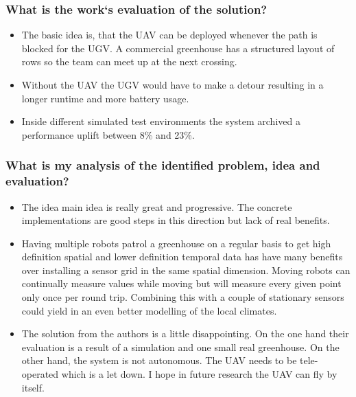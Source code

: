 \subsubsection*{What is the work`s evaluation of the solution?}
\begin{itemize}
    \item The basic idea is, that the UAV can be deployed whenever the path is blocked for the UGV. A commercial greenhouse has a structured layout of rows so the team can meet up at the next crossing.
    \item Without the UAV the UGV would have to make a detour resulting in a longer runtime and more battery usage.
    \item Inside different simulated test environments the system archived a performance uplift between 8\% and 23\%.
\end{itemize}
\subsubsection*{What is my analysis of the identified problem, idea and evaluation?}
\begin{itemize}
    \item The idea main idea is really great and progressive. The concrete implementations are good steps in this direction but lack of real benefits.
    \item Having multiple robots patrol a greenhouse on a regular basis to get high definition spatial and lower definition temporal data has have many benefits over installing 
    a sensor grid in the same spatial dimension. Moving robots can continually measure values while moving but will measure every given point only once per round trip. Combining this
    with a couple of stationary sensors could yield in an even better modelling of the local climates.
    \item The solution from the authors is a little disappointing. On the one hand their evaluation is a result of a simulation and one small real greenhouse. On the other hand,
    the system is not autonomous. The UAV needs to be tele-operated which is a let down. I hope in future research the UAV can fly by itself.
\end{itemize}
